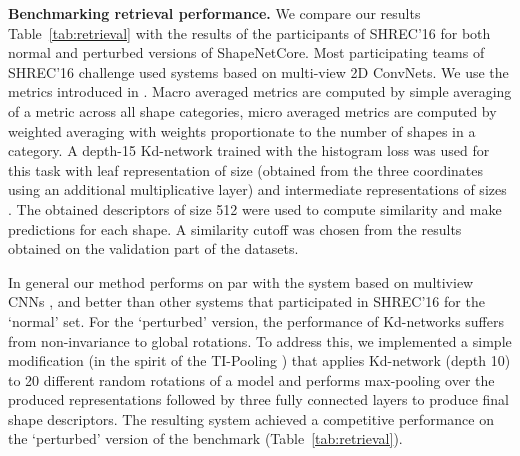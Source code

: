 \documentclass[10pt,twocolumn,letterpaper]{article}
\newcommand{\tab}[1]{Table~\ref{tab:#1}}
\begin{document}
\textbf{Benchmarking retrieval performance.} We compare our results \tab{retrieval} with the results of the participants of SHREC'16 for both normal and perturbed versions of ShapeNetCore. Most participating teams of SHREC'16 challenge used systems based on multi-view 2D ConvNets. We use the metrics introduced in \cite{Savva16}. Macro averaged metrics are computed by simple averaging of a metric across all shape categories, micro averaged metrics are computed by weighted averaging with weights proportionate to the number of shapes in a category. A depth-15 Kd-network trained with the histogram loss \cite{Ustinova16} was used for this task with leaf representation of size  (obtained from the three coordinates using an additional multiplicative layer) and intermediate representations of sizes . The obtained descriptors of size 512 were used to compute similarity and make predictions for each shape. A similarity cutoff was chosen from the results obtained on the validation part of the datasets.

In general our method performs on par with the system based on multiview CNNs \cite{Su15}, and better than other systems that participated in SHREC'16 for the `normal' set. For the `perturbed' version, the performance of Kd-networks suffers from non-invariance to global rotations. To address this, we implemented a simple modification (in the spirit of the TI-Pooling \cite{Laptev16}) that applies Kd-network (depth 10) to 20 different random rotations of a model and performs max-pooling over the produced representations followed by three fully connected layers to produce final shape descriptors. The resulting system achieved a competitive performance on the `perturbed' version of the benchmark (\tab{retrieval}).
\end{document}
